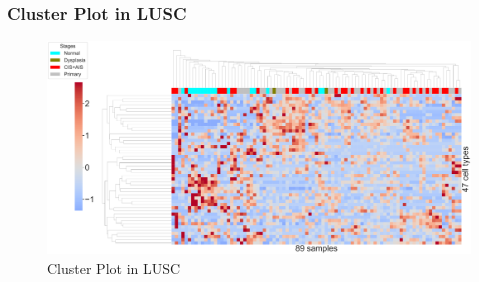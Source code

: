 \documentclass{beamer}
\begin{document}
    \begin{frame}
        \frametitle{Cluster Plot in LUSC}

        \begin{figure}
            \includegraphics[width=0.9 \linewidth]{figures/BisqueRNA/clustermap/STAR.FPKM.GSE131907.SQC.pdf}
            \caption{Cluster Plot in LUSC}
        \end{figure}
    \end{frame}
\end{document}
